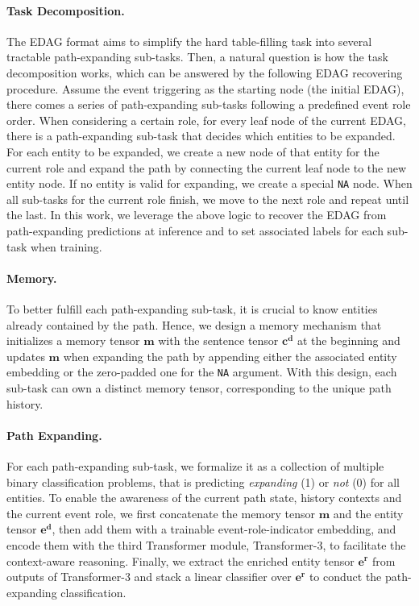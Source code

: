 \documentclass[11pt,a4paper]{article}
\begin{document}
\paragraph{Task Decomposition.}
The EDAG format aims to simplify the hard table-filling task into several tractable path-expanding sub-tasks.
Then, a natural question is how the task decomposition works, which can be answered by the following EDAG recovering procedure.
Assume the event triggering as the starting node (the initial EDAG), there comes a series of path-expanding sub-tasks following a predefined event role order. 
When considering a certain role, for every leaf node of the current EDAG, there is a path-expanding sub-task that decides which entities to be expanded.
For each entity to be expanded, we create a new node of that entity for the current role and expand the path by connecting the current leaf node to the new entity node.
If no entity is valid for expanding, we create a special \texttt{NA} node.
When all sub-tasks for the current role finish, we move to the next role and repeat until the last.
In this work, we leverage the above logic to recover the EDAG from path-expanding predictions at inference and to set associated labels for each sub-task when training.

\paragraph{Memory.}
To better fulfill each path-expanding sub-task, it is crucial to know entities already contained by the path.
Hence, we design a memory mechanism that initializes a memory tensor $\bm{m}$ with the sentence tensor $\bm{c^d}$ at the beginning and updates $\bm{m}$ when expanding the path by appending either the associated entity embedding or the zero-padded one for the \texttt{NA} argument.
With this design, each sub-task can own a distinct memory tensor, corresponding to the unique path history.

\paragraph{Path Expanding.}
For each path-expanding sub-task, we formalize it as a collection of multiple binary classification problems, that is predicting \textit{expanding} (1) or \textit{not} (0) for all entities.
To enable the awareness of the current path state, history contexts and the current event role,
we first concatenate the memory tensor $\bm{m}$ and the entity tensor $\bm{e^d}$,
then add them with a trainable event-role-indicator embedding,
and encode them with the third Transformer module, Transformer-3, to facilitate the context-aware reasoning.
Finally, we extract the enriched entity tensor $\bm{e^r}$ from outputs of Transformer-3 and stack a linear classifier over $\bm{e^r}$ to conduct the path-expanding classification.
\end{document}
